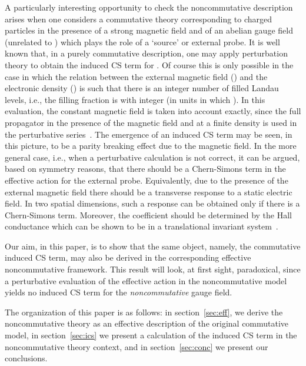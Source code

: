 \documentclass[a4paper,12pt]{article}
\begin{document}
A particularly interesting opportunity to check the noncommutative
description arises when one considers a commutative theory
corresponding to charged particles in the presence of a strong
magnetic field and of an abelian gauge field \coordHE{}
(unrelated to \coordHE{}) which plays the role of a `source' or external
probe. It is well known that, in a purely commutative description, one
may apply perturbation theory to obtain the induced CS term for
\coordHE{}. Of course this is only possible in the case in which
the relation between the external magnetic field (\coordHE{}) and the
electronic density (\myHighlight{$\rho$}\coordHE{}) is such that there is an integer number of
filled Landau levels, i.e., the filling fraction is \mbox{\coordHE{}} with \coordHE{} integer (in units in 
which \coordHE{}).
In this evaluation, the constant magnetic field is taken into account
exactly, since the full propagator in the presence of the magnetic
field and at a finite density is used in the perturbative
series~\cite{lf}. The emergence of an induced CS term may be seen, in
this picture, to be a parity breaking effect due to the magnetic
field.  In the more general case, i.e., when a perturbative
calculation is not correct, it can be argued, based on symmetry
reasons, that there should be a Chern-Simons term in the effective
action for the external probe. Equivalently, due to the presence of
the external magnetic field there should be a transverse response to a
static electric field. In two spatial dimensions, such a response can
be obtained only if there is a Chern-Simons term. Moreover, the
coefficient should be determined by the Hall conductance which can be
shown to be \coordHE{} in a translational invariant
system~\cite{PG}.


Our aim, in this paper, is to show that the same object, namely, the
commutative induced CS term, may also be derived in the corresponding
effective noncommutative framework. This result will look, at first
sight, paradoxical, since a perturbative evaluation of the effective
action in the noncommutative model yields no induced CS term for the
{\em noncommutative\/} gauge field. 

The organization of this paper is as follows: in
section~\ref{sec:eff}, we derive the noncommutative theory as an
effective description of the original commutative model, in
section~\ref{sec:ics} we present a calculation of the induced CS term
in the noncommutative theory context, and in section~\ref{sec:conc} we
present our conclusions.
\end{document}
